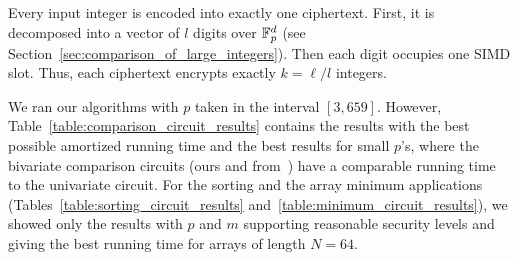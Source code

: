 Every input integer is encoded into exactly one ciphertext.
First, it is decomposed into a vector of $l$ digits over $\mathbb{F}_p^d$ (see Section~\ref{sec:comparison_of_large_integers}).
Then each digit occupies one SIMD slot.
Thus, each ciphertext encrypts exactly $k = \ell/l$ integers. 

We ran our algorithms with $p$ taken in the interval $[3,659]$.
However, Table~\ref{table:comparison_circuit_results} contains the results with the best possible amortized running time and the best results for small $p$'s, where the bivariate comparison circuits (ours and from~\cite{TLWRK20}) have a comparable running time to the univariate circuit.
For the sorting and the array minimum applications (Tables~\ref{table:sorting_circuit_results} and~\ref{table:minimum_circuit_results}), we showed only the results with $p$ and $m$ supporting reasonable security levels and giving the best running time for arrays of length $N=64$.

